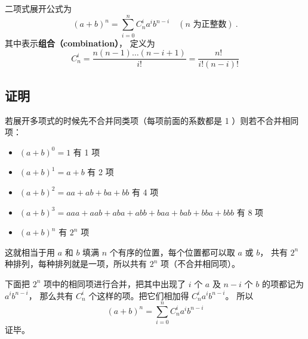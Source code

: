 

二项式展开公式为
\begin{equation}\label{eq_BiNor_1}
(a + b)^n = \sum_{i = 0}^n C_n^i a^i b^{n - i} \quad (n \text{ 为正整数})~.
\end{equation}
其中表示\textbf{组合（combination）}， 定义为 %
\begin{equation}
C_n^i = \frac{n(n - 1)\dots (n - i + 1)}{i!} = \frac{n!}{i!(n - i)!}
\end{equation}

\subsection{证明}\label{sub_BiNor_5}
若展开多项式的时候先不合并同类项（每项前面的系数都是 1 ）则若不合并相同项：
\begin{itemize}
\item $(a + b)^0 = 1$ 有 1 项
\item $(a + b)^1 = a + b$ 有 2 项
\item $(a + b)^2 = aa + ab + ba + bb$ 有 4 项
\item $(a + b)^3 = aaa + aab + aba + abb + baa + bab + bba + bbb$ 有 8 项
\item $(a + b)^n$ 有 $2^n$ 项
\end{itemize}

这就相当于用 $a$ 和 $b$ 填满 $n$ 个有序的位置，每个位置都可以取 $a$ 或 $b$， 共有 $2^n$ 种排列，每种排列就是一项，所以共有 $2^n$ 项（不合并相同项）。

下面把 $2^n$ 项中的相同项进行合并，把其中出现了 $i$ 个 $a$ 及 $n-i$ 个 $b$ 的项都记为 $a^i b^{n-i}$， 那么共有 $C_n^i$ 个这样的项。把它们相加得 $C_n^i a^i b^{n-i}$。 所以
\begin{equation}
(a + b)^n = \sum_{i = 0}^n  C_n^i a^i b^{n - i}
\end{equation}
证毕。
